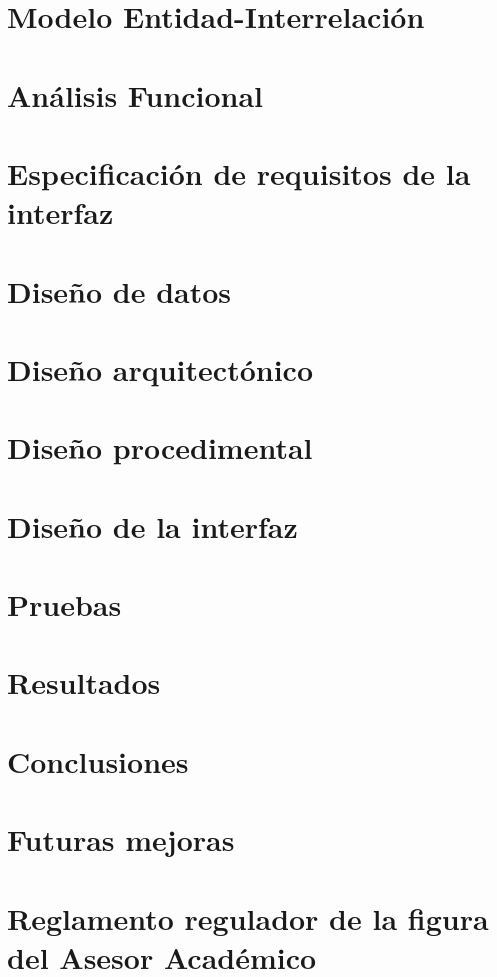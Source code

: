 \documentclass[a4paper,12pt]{book}
\begin{document}
   \chapter{Modelo Entidad-Interrelación}\label{modEntInt}
      
      

   \chapter{Análisis Funcional}

   \chapter{Especificación de requisitos de la interfaz}\label{espReqInt}

   \chapter{Diseño de datos}

   \chapter{Diseño arquitectónico}

   \chapter{Diseño procedimental}

   \chapter{Diseño de la interfaz}

   \chapter{Pruebas}\label{pruebas}

   \chapter{Resultados}

   \chapter{Conclusiones}

   \chapter{Futuras mejoras}

   

   \appendix
   \chapter{Reglamento regulador de la figura del Asesor Académico}\label{a1}
   
\end{document}
